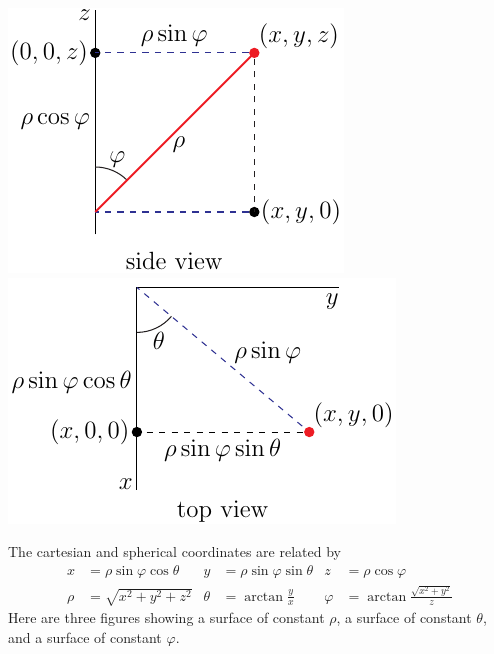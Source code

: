 \begin{efig}
\begin{center}
    \includegraphics{sphericalSide.pdf}\qquad
    \includegraphics{sphericalTop.pdf}\qquad
\end{center}
\end{efig}
The cartesian and spherical coordinates
are related by
\begin{align*}
x&=\rho\sin\varphi\cos\theta &
y&=\rho\sin\varphi\sin\theta &
z&=\rho\cos\varphi \\
 \rho&=\sqrt{x^2+y^2+z^2} &
 \theta&=\arctan\frac{y}{x} &
 \varphi&=\arctan\frac{\sqrt{x^2+y^2}}{z}
\end{align*}
Here are three figures showing a surface of constant $\rho$,
a surface of constant $\theta$, and a surface of constant $\varphi$.
